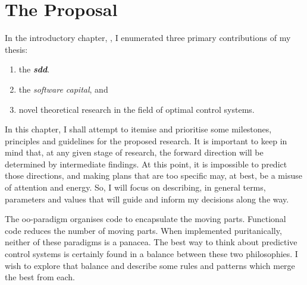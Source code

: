 %
\chapter{The Proposal}%
\label{chap:proposal}


In the introductory chapter, , I enumerated three
primary contributions of my thesis:
%
%
\begin{enumerate}[label=(C\arabic*)]
  \item the \textbf{\textit{\acl{sdd}}}. \label{contrib:design}
  \item the \emph{software capital}, and \label{contrib:capital}
  \item novel theoretical research in the field of optimal control
  systems.\label{contrib:theory}
\end{enumerate}
In this chapter, I shall attempt to itemise and prioritise some milestones,
principles and guidelines for the proposed research. It is important to keep in
mind that, at any given stage of research, the forward direction will be
determined by intermediate findings. At this point, it is impossible to predict
those directions, and making plans that are too specific may, at best, be a
misuse of attention and energy. So, I will focus on describing, in general
terms, parameters and values that will guide and inform my decisions along the
way.

The \ac{oo}-paradigm organises code to encapsulate the moving parts. Functional
code reduces the number of moving parts. When implemented puritanically, neither
of these paradigms is a panacea. The best way to think about predictive control
systems is certainly found in a balance between these two philosophies. I wish
to explore that balance and describe some rules and patterns which merge the
best from each.
